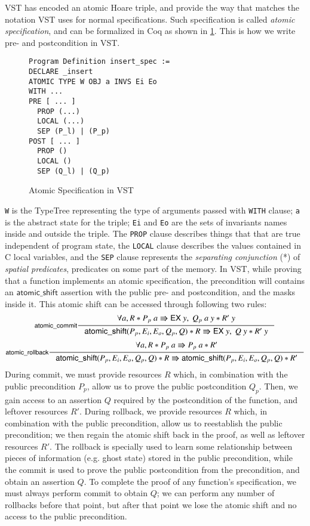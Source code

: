 \documentclass[runningheads]{llncs}
\begin{document}
{VST has encoded an atomic Hoare triple, and provide the way that matches the notation VST uses for normal specifications. Such specification is called \emph{atomic specification}, and can be formalized in Coq as shown in  \ref{atomic-spec}.  This is how we write pre- and postcondition in VST. 
\begin{figure}[htb]
\centering
\begin{verbatim}
Program Definition insert_spec :=
DECLARE _insert
ATOMIC TYPE W OBJ a INVS Ei Eo
WITH ...
PRE [ ... ]
  PROP (...)
  LOCAL (...)
  SEP (P_l) | (P_p)
POST [ ... ]
  PROP ()
  LOCAL ()
  SEP (Q_l) | (Q_p)
\end{verbatim}
\caption{Atomic Specification in VST}
\label{atomic-spec}
\end{figure}
\texttt{W} is the \textsf{TypeTree} representing the type of arguments passed with \texttt{WITH} clause; \texttt{a} is the abstract state for the triple; \texttt{Ei} and \texttt{Eo} are the sets of invariants names inside and outside the triple. The \texttt{PROP} clause describes things that that are true independent of program state, the \texttt{LOCAL} clause describes the values contained in C local variables, and the \texttt{SEP} clause represents the \emph{separating conjunction} (*) of \emph{spatial predicates}, predicates on some part of the memory. In VST, while proving that a function implements an atomic specification, the precondition will contains an $\mathsf{atomic\_shift}$ assertion with the public pre- and postcondition, and the masks inside it. This atomic shift can be accessed through following two rules:
$$\inference[\textsf{atomic\_commit}]{\forall a, R * P_p\ a \Rrightarrow \mathsf{EX}\ y,\ Q_p\ a\ y * R'\ y}{\textsf{atomic\_shift}(P_p, E_i, E_o, Q_p, Q) * R \Rrightarrow \mathsf{EX}\ y,\ Q\ y * R'\ y}$$
$$\inference[\textsf{atomic\_rollback}]{\forall a, R * P_p\ a \Rrightarrow P_p\ a * R'}{\textsf{atomic\_shift}(P_p, E_i, E_o, Q_p, Q) * R \Rrightarrow \textsf{atomic\_shift}(P_p, E_i, E_o, Q_p, Q) * R'}$$
During commit, we must provide resources $R$ which, in combination with the public precondition $P_p$, allow us to prove the public postcondition $Q_p$. Then, we gain access to an assertion $Q$ required by the postcondition of the function, and leftover resources $R'$. During rollback, we provide resources $R$ which, in combination with the public precondition, allow us to reestablish the public precondition; we then regain the atomic shift back in the proof, as well as leftover resources $R'$. The rollback is specially used to learn some relationship between pieces of information (e.g. ghost state) stored in the public precondition, while the commit is used to prove the public postcondition from the precondition, and obtain an assertion $Q$. To complete the proof of any function's specification, we must always perform commit to obtain $Q$; we can perform any number of rollbacks before that point, but after that point we lose the atomic shift and no access to the public precondition.}
\end{document}
